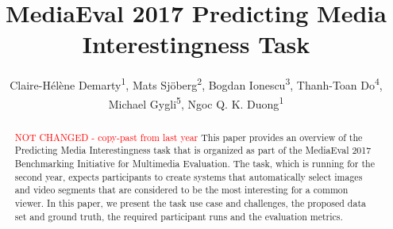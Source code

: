 \documentclass[sigconf]{acmart-me}
\begin{document}
\title{MediaEval 2017 Predicting Media Interestingness Task}



%
\author{Claire-H\'{e}l\`{e}ne Demarty\textsuperscript{1}, Mats Sj\"{o}berg\textsuperscript{2}, Bogdan Ionescu\textsuperscript{3}, Thanh-Toan Do\textsuperscript{4}, \\ Michael Gygli\textsuperscript{5}, Ngoc Q. K. Duong\textsuperscript{1}}



\renewcommand{\shortauthors}{C.H. Demarty et al.}


\begin{abstract}
\textcolor{red}{NOT CHANGED - copy-past from last year}
This paper provides an overview of the Predicting Media
Interestingness task that is organized as part of the Media\-Eval
2017 Benchmarking Initiative for Multimedia Evaluation. The task, which is
running for the second year, expects participants to create systems that automatically
select images and video segments that are considered to be the most
interesting for a common viewer. In this paper, we present the task use case and
challenges, the proposed data set and ground truth, the required
participant runs and the evaluation metrics.
\end{abstract}
\end{document}
